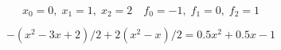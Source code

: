 \[ x_0=0, \; x_1=1, \; x_2=2 \quad f_0=-1, \; f_1=0, \; f_2=1 \]

\[ -(x^2-3x+2)/2+2(x^2-x)/2=0.5x^2+0.5x-1 \]
